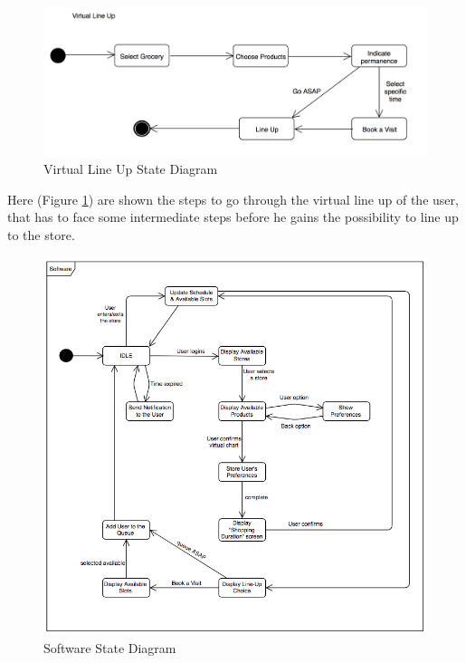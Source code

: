 \documentclass[]{article}
\begin{document}
		\textbf{}\\ \newline
		\textbf{}\\ \newline
		
		\begin{figure}[H]
			\centering
			\includegraphics[width=\linewidth]{virtualqueue.png}
			\caption{Virtual Line Up State Diagram}
			\label{fig:state_diagram3}
		\end{figure}
		
		Here (Figure \ref{fig:state_diagram3})  are shown the steps to go through the virtual line up of the user, that has to face some intermediate steps before he gains the possibility to line up to the store. \\
		
		\begin{figure}[H]
			\centering
			\includegraphics[width=\linewidth]{software.png}
			\caption{Software State Diagram}
			\label{fig:state_diagram4}
		\end{figure}
		
\end{document}
